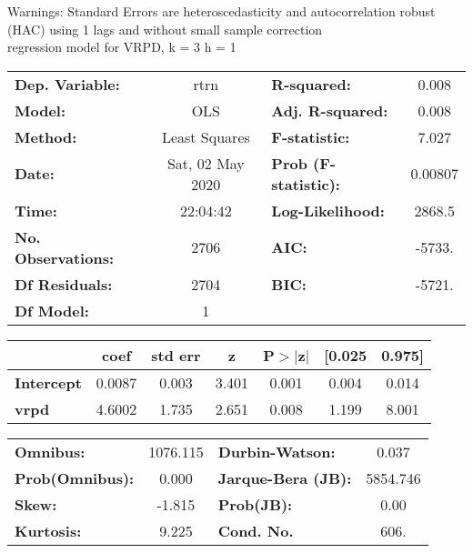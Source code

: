Warnings: \newline
 [1] Standard Errors are heteroscedasticity and autocorrelation robust (HAC) using 1 lags and without small sample correction\\ 

regression model for VRPD, k = 3 h = 1\begin{center}
\begin{tabular}{lclc}
\toprule
\textbf{Dep. Variable:}    &       rtrn       & \textbf{  R-squared:         } &     0.008   \\
\textbf{Model:}            &       OLS        & \textbf{  Adj. R-squared:    } &     0.008   \\
\textbf{Method:}           &  Least Squares   & \textbf{  F-statistic:       } &     7.027   \\
\textbf{Date:}             & Sat, 02 May 2020 & \textbf{  Prob (F-statistic):} &  0.00807    \\
\textbf{Time:}             &     22:04:42     & \textbf{  Log-Likelihood:    } &    2868.5   \\
\textbf{No. Observations:} &        2706      & \textbf{  AIC:               } &    -5733.   \\
\textbf{Df Residuals:}     &        2704      & \textbf{  BIC:               } &    -5721.   \\
\textbf{Df Model:}         &           1      & \textbf{                     } &             \\
\bottomrule
\end{tabular}
\begin{tabular}{lcccccc}
                   & \textbf{coef} & \textbf{std err} & \textbf{z} & \textbf{P$> |$z$|$} & \textbf{[0.025} & \textbf{0.975]}  \\
\midrule
\textbf{Intercept} &       0.0087  &        0.003     &     3.401  &         0.001        &        0.004    &        0.014     \\
\textbf{vrpd}      &       4.6002  &        1.735     &     2.651  &         0.008        &        1.199    &        8.001     \\
\bottomrule
\end{tabular}
\begin{tabular}{lclc}
\textbf{Omnibus:}       & 1076.115 & \textbf{  Durbin-Watson:     } &    0.037  \\
\textbf{Prob(Omnibus):} &   0.000  & \textbf{  Jarque-Bera (JB):  } & 5854.746  \\
\textbf{Skew:}          &  -1.815  & \textbf{  Prob(JB):          } &     0.00  \\
\textbf{Kurtosis:}      &   9.225  & \textbf{  Cond. No.          } &     606.  \\
\bottomrule
\end{tabular}
\end{center}

